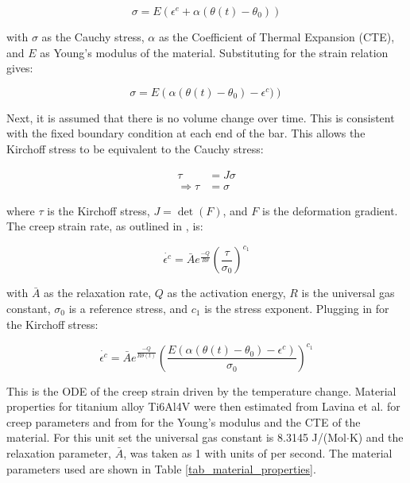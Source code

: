 \documentclass[conf]{new-aiaa}
\begin{document}
\begin{equation}
\sigma = E \left( \epsilon^e + \alpha (\theta(t) - \theta_0) \right)
\end{equation}

\noindent
with $\sigma$ as the Cauchy stress, 
$\alpha$ as the Coefficient of Thermal Expansion (CTE),
and 
$E$ as Young's modulus of the material.
Substituting for the strain relation gives:

\begin{equation}
\sigma = E \left( \alpha (\theta(t) - \theta_0) - \epsilon^c) \right) 
\end{equation}

Next, it is assumed that there is no volume change over time.
This is consistent with the fixed boundary condition at 
each end of the bar.
This allows the Kirchoff stress to be equivalent to the Cauchy stress:

\begin{align}
\tau &= J \sigma \\
\Rightarrow
  \tau &= \sigma
\end{align}

\noindent
where $\tau$ is the Kirchoff stress,
$J=\det(F)$,
and $F$ is the deformation gradient.
The creep strain rate, as outlined in 
\cite{ li_simulation_of_finite_strain_inelastic_phenomena_governed_by_creep_and_plasticity},
is:

\begin{equation}
\dot{\epsilon^c} = \bar{A} e^{\frac{-Q}{R \theta}} \left( \frac{\tau}{\sigma_0} \right)^{c_1}
\end{equation}

\noindent
with $\bar{A}$ as the relaxation rate,
$Q$ as the activation energy,
$R$ is the universal gas constant,
$\sigma_0$ is a reference stress,
and
$c_1$ is the stress exponent.
Plugging in for the Kirchoff stress:

\begin{equation} \label{eq_creep_ode}
\dot{\epsilon^c} = \bar{A} e^{\frac{-Q}{R \theta(t)}} 
    \left( \frac{E ( \alpha (\theta(t) - \theta_0) - \epsilon^c)}{\sigma_0} \right)^{c_1}
\end{equation}

This is the ODE of the creep strain driven by the temperature change.
Material properties for titanium alloy Ti6Al4V were then estimated from
Lavina et al. \cite{ lavina_creep_behavior_of_Ti6Al4V_from_450C_to_600C}
for creep parameters and from \cite{
boyer_materials_properties_handbook_titanium_alloys}
for the Young's modulus and the CTE of the material.
For this unit set the universal gas constant is 8.3145 J/(Mol$\cdot$K)
and the relaxation parameter, $\bar{A}$, was taken as 1 with units of per second.
The material parameters used are shown in Table \ref{tab_material_properties}.
\end{document}
